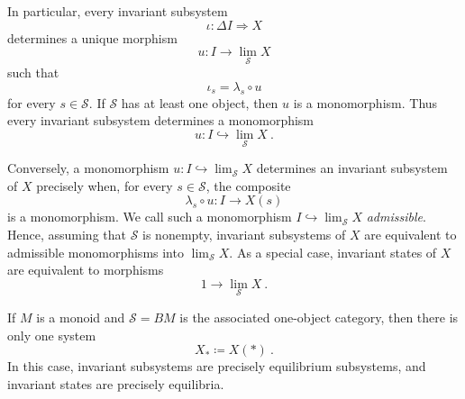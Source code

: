 \documentclass[a4paper,reqno,oneside]{amsart}
\theoremstyle{definition}
\theoremstyle{remark}
\numberwithin{equation}{section}
\begin{document}
	In particular, every invariant subsystem
	\begin{equation}
		\iota\colon \Delta I\Longrightarrow X
	\end{equation}
	determines a unique morphism
	\begin{equation}
		u\colon I\longrightarrow \lim_{\mathcal S}X
	\end{equation}
	such that
	\begin{equation}
		\iota_s=\lambda_s\circ u
	\end{equation}
	for every $s\in\mathcal S$. If $\mathcal S$ has at least one object, then
	$u$ is a monomorphism. Thus every invariant subsystem determines a monomorphism
	\begin{equation}
		u\colon I\hookrightarrow \lim_{\mathcal S}X \ .
	\end{equation}


Conversely, a monomorphism $u\colon I\hookrightarrow \lim_{\mathcal S}X$ determines an invariant subsystem of $X$ precisely when, for every
$s\in\mathcal S$, the composite
\begin{equation}
    \lambda_s\circ u\colon I\longrightarrow X(s)
\end{equation}
is a monomorphism. We call such a monomorphism $I\hookrightarrow \lim_{\mathcal S}X$ \textit{admissible}. Hence, assuming that $\mathcal S$ is nonempty, invariant subsystems of $X$ are equivalent to admissible monomorphisms into $\lim_{\mathcal S}X$. As a special case, invariant states of $X$ are equivalent to morphisms
\begin{equation}
    1\longrightarrow \lim_{\mathcal S}X \ .
\end{equation}


	
	
	\medskip
	
	
	
	If $M$ is a monoid and $\mathcal S=BM$ is the associated one-object
	category, then there is only one system
	\begin{equation}
		X_*\coloneqq X(*) \ .
	\end{equation}
	In this case, invariant
	subsystems are precisely equilibrium subsystems, and invariant states are
	precisely equilibria.
	
\end{document}
